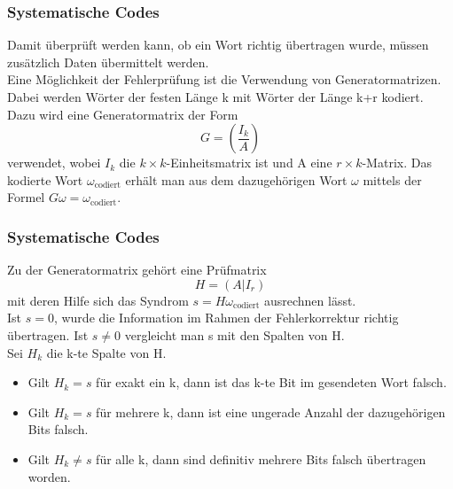 \begin{frame}
	\frametitle{Systematische Codes}
	Damit überprüft werden kann, ob ein Wort richtig übertragen wurde, müssen zusätzlich Daten übermittelt werden.\\
	Eine Möglichkeit der Fehlerprüfung ist die Verwendung von Generatormatrizen.\\ 
	Dabei werden Wörter der festen Länge k mit Wörter der Länge k+r kodiert. Dazu wird eine Generatormatrix der Form \[G=\left(\frac{I_k}{A}\right)\] verwendet, wobei $I_k$ die $k \times k$-Einheitsmatrix ist und A eine $r \times k$-Matrix. Das kodierte Wort $\omega_{\text{codiert}}$ erhält man aus dem dazugehörigen Wort $\omega$ mittels der Formel $G\omega=\omega_{\text{codiert}}.$\\
\end{frame}
\begin{frame}
	\frametitle{Systematische Codes}
	Zu der Generatormatrix gehört eine Prüfmatrix \[H=\left(A|I_r\right)\] mit deren Hilfe sich das Syndrom $s=H\omega_{\text{codiert}}$ ausrechnen lässt.\\ Ist $s=0$, wurde die Information im Rahmen der Fehlerkorrektur richtig übertragen. Ist $s\not = 0$ vergleicht man s mit den Spalten von H.\\ Sei $H_k$ die k-te Spalte von H.
	\begin{itemize}
	\item Gilt $H_k=s$ für exakt ein k, dann ist das k-te Bit im gesendeten Wort falsch.
	\item Gilt $H_k=s$ für mehrere k, dann ist eine ungerade Anzahl der dazugehörigen Bits falsch.
	\item Gilt $H_k\not=s$ für alle k, dann sind definitiv mehrere Bits falsch übertragen worden.
	\end{itemize}
\end{frame}
